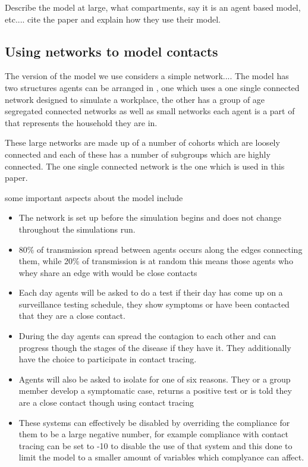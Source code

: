 \documentclass{article}
\begin{document}
Describe the model at large, what compartments, say it is an agent based model, etc.... cite the paper and explain how they use their model.




\subsection{Using networks to model contacts}

The version of the model we use considers a simple network.... The model has two structures agents can be arranged in , one which uses a one single connected network designed to simulate a workplace, the other has a group of age segregated connected networks as well as small networks each agent is a part of that represents the household they are in. 

These large networks are made up of a number of cohorts which are loosely connected and each of these has a number of subgroups which are highly connected. The one single connected network is the one which is used in this paper.

some important aspects about the model include
\begin{itemize}

\item The network is set up before the simulation begins and does not change throughout the simulations run. 

\item 80\% of transmission spread between agents occurs along the edges connecting them, while 20\% of transmission is at  random this means those agents who whey share an edge with would be close contacts

\item Each day agents will be asked to do a test if their day has come up on a surveillance testing schedule, they show symptoms or have been contacted that they are a close contact.

\item During the day agents can spread the contagion to each other and can progress though the stages of the disease if they have it. They additionally have the choice to participate in contact tracing.

\item Agents will also be asked to isolate for one of six reasons. They or a group member develop a symptomatic case, returns a positive test or is told they are a close contact though using contact tracing

\item These systems can effectively be disabled by overriding the compliance for them to be a large negative number, for example compliance with contact tracing can be set to -10 to disable the use of that system and this done to limit the model to a smaller amount of variables which complyance can affect.
\end{itemize}
\end{document}
